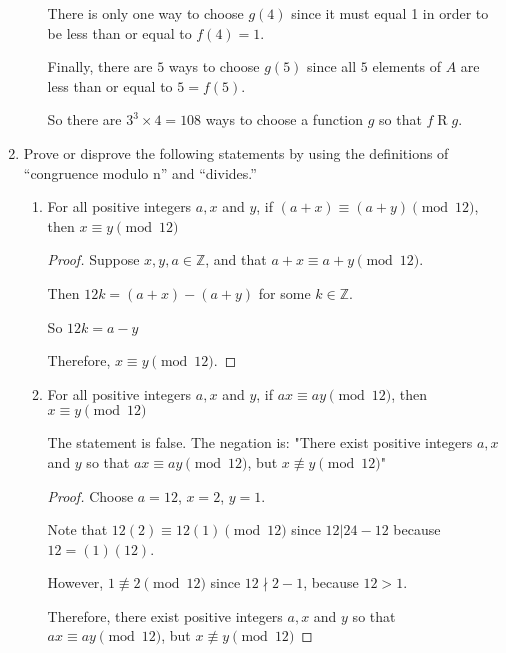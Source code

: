 \documentclass[]{article}
\begin{document}
\begin{enumerate}
\begin{enumerate}[resume*]
        There is only one way to choose $g(4)$ since it must equal 1 in order to 
        be less than or equal to $f(4)=1$.

        Finally, there are $5$ ways to choose $g(5)$ since all $5$ elements of 
        $A$ are less than or equal to $5=f(5)$.

        So there are $3^3\times4=108$ ways to choose a function $g$ so that $f\mathrel{R}g$.

        \end{enumerate}
        
        \newpage
        \item Prove or disprove the following statements by using the definitions of “congruence modulo
        n” and “divides.”

        \begin{enumerate}[label= (\alph*)]
        \item For all positive integers $a,x$ and $y$, if $(a+x)\equiv (a+y)\pmod{12}$,
        then $x\equiv y\pmod {12}$

        \begin{proof}
            Suppose $x,y,a\in\mathbb{Z}$, and that $a+x\equiv a+y\pmod{12}$.

            Then $12k=(a+x)-(a+y)$ for some $k\in\mathbb{Z}$.

            So $12k=a-y$

            Therefore, $x\equiv y\pmod{12}$.
        \end{proof}

        \item For all positive integers $a,x$ and $y$, if $ax\equiv ay\pmod{12}$,
        then $x\equiv y\pmod{12}$

        The statement is false. The negation is: "There exist positive integers
        $a,x$ and $y$ so that $ax\equiv ay\pmod{12}$,
        but $x \not\equiv y\pmod{12}$"

        \begin{proof}
            Choose $a=12$, $x=2$, $y=1$.

            Note that $12(2)\equiv12(1)\pmod{12}$ since 
            $12|24-12$ because $12=(1)(12)$.

            However, $1\not\equiv2\pmod{12}$ since $12\nmid2-1$, because $12>1$.

            Therefore, there exist positive integers
            $a,x$ and $y$ so that $ax\equiv ay\pmod{12}$,
            but $x \not\equiv y\pmod{12}$
        \end{proof}


\end{enumerate}
\end{enumerate}
\end{document}
